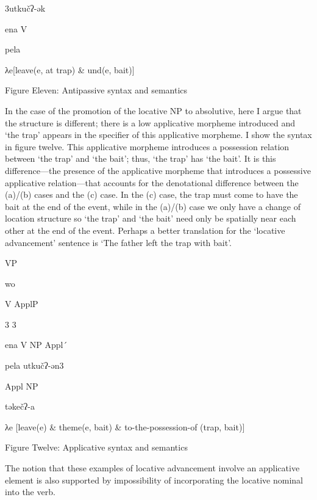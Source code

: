 \documentclass[output=paper,modfonts,nonflat]{langsci/langscibook}
\begin{document}
        3utkučʔ-ək

      ena           V

            pela

\begin{styleListParagraph}
λe[leave(e, at trap) \& und(e, bait)]
\end{styleListParagraph}

\begin{stylecaption}
Figure Eleven: Antipassive syntax and semantics
\end{stylecaption}

In the case of the promotion of the locative NP to absolutive, here I argue that the structure is different; there is a low applicative morpheme introduced and ‘the trap’ appears in the specifier of this applicative morpheme.  I show the syntax in figure twelve.  This applicative morpheme introduces a possession relation between ‘the trap’ and ‘the bait’; thus, ‘the trap’ has ‘the bait’.  It is this difference—the presence of the applicative morpheme that introduces a possessive applicative relation—that accounts for the denotational difference between the (a)/(b) cases and the (c) case. In the (c) case, the trap must come to have the bait at the end of the event, while in the (a)/(b) case we only have a change of location structure so ‘the trap’ and ‘the bait’ need only be spatially near each other at the end of the event.  Perhaps a better translation for the ‘locative advancement’ sentence is ‘The father left the trap with bait’.

              VP  

    wo

               V               ApplP     

      3     3

           ena          V    NP          Appl´      

                          pela  utkučʔ-ən3

                                    Appl        NP

                  təkečʔ-a  

  λe [leave(e) \& theme(e, bait) \& to-the-possession-of (trap, bait)]

\begin{stylecaption}
Figure Twelve: Applicative syntax and semantics
\end{stylecaption}

The notion that these examples of locative advancement involve an applicative element is also supported by impossibility of incorporating the locative nominal into the verb.
\end{document}
